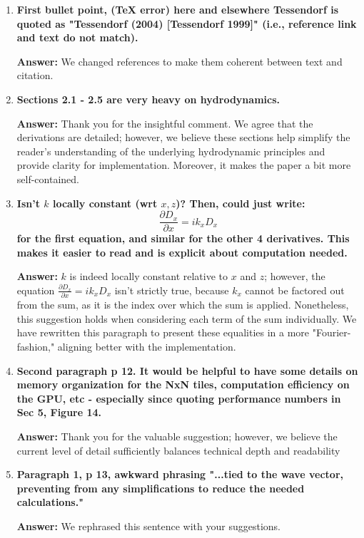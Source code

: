 \documentclass{article}
\newcommand{\answer}[1]{\textbf{\textcolor{answercolor}{Answer:}} \textcolor{answercolor}{#1}}
\begin{document}
\begin{enumerate}[label=\textbf{\arabic*.}]
    \item \textbf{First bullet point, (TeX error) here and elsewhere Tessendorf is quoted as "Tessendorf (2004) [Tessendorf 1999]" (i.e., reference link and text do not match).}
    
    \answer{We changed references to make them coherent between text and citation.}

    \item \textbf{Sections 2.1 - 2.5 are very heavy on hydrodynamics.} 
    
    \answer{Thank you for the insightful comment. We agree that the derivations are detailed; however, we believe these sections help simplify the reader's understanding of the underlying hydrodynamic principles and provide clarity for implementation. Moreover, it makes the paper a bit more self-contained.}

    \item \textbf{Isn't $k$ locally constant (wrt $x,z$)? Then, could just write:}
    \[
    \frac{\partial D_x}{\partial x} = i k_x D_x
    \]
    \textbf{for the first equation, and similar for the other 4 derivatives. This makes it easier to read and is explicit about computation needed.}
    
    \answer{$k$ is indeed locally constant relative to $x$ and $z$; however, the equation $\frac{\partial D_x}{\partial x} = i k_x D_x$ isn't strictly true, because $k_x$ cannot be factored out from the sum, as it is the index over which the sum is applied. Nonetheless, this suggestion holds when considering each term of the sum individually. We have rewritten this paragraph to present these equalities in a more "Fourier-fashion," aligning better with the implementation.}

    \item \textbf{Second paragraph p 12. It would be helpful to have some details on memory organization for the NxN tiles, computation efficiency on the GPU, etc - especially since quoting performance numbers in Sec 5, Figure 14.}
    
    \answer{Thank you for the valuable suggestion; however, we believe the current level of detail sufficiently balances technical depth and readability}

    \item \textbf{Paragraph 1, p 13, awkward phrasing "...tied to the wave vector, preventing from any simplifications to reduce the needed calculations."}
    
    \answer{We rephrased this sentence with your suggestions.}


\end{enumerate}
\end{document}
